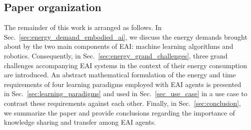 \subsection{Paper organization}
The remainder of this work is arranged as follows. In Sec.~\ref{sec:energy_demand_embodied_ai}, we discuss the energy demands brought about by the two main components of EAI: machine learning algorithms and robotics. Consequently, in Sec.~\ref{sec:energy_grand_challenges}, three grand challenges accompanying EAI systems in the context of their energy consumption are introduced. An abstract mathematical formulation of the energy and time requirements of four learning paradigms employed with EAI agents is presented in Sec.~\ref{sec:learning_paradigms} and used in Sec.~\ref{sec_use_case} in a use case to contrast these requirements against each other. Finally, in Sec.~\ref{sec:conclusion}, we summarize the paper and provide conclusions regarding the importance of knowledge sharing and transfer among EAI agents. 